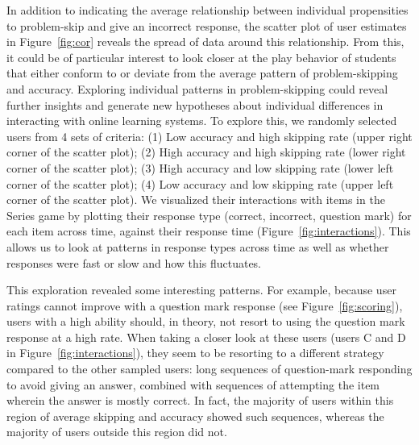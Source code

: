 \documentclass{edm_article}
\begin{document}
In addition to indicating the average relationship between individual propensities to problem-skip and give an incorrect response, the scatter plot of user estimates in Figure~\ref{fig:cor} reveals the spread of data around this relationship. From this, it could be of particular interest to look closer at the play behavior of students that either conform to or deviate from the average pattern of problem-skipping and accuracy. Exploring individual patterns in problem-skipping could reveal further insights and generate new hypotheses about individual differences in interacting with online learning systems. To explore this, we randomly selected users from 4 sets of criteria: (1) Low accuracy and high skipping rate (upper right corner of the scatter plot); (2) High accuracy and high skipping rate (lower right corner of the scatter plot); (3) High accuracy and low skipping rate (lower left corner of the scatter plot); (4) Low accuracy and low skipping rate (upper left corner of the scatter plot). We visualized their interactions with items in the Series game by plotting their response type (correct, incorrect, question mark) for each item across time, against their response time (Figure~\ref{fig:interactions}). This allows us to look at patterns in response types across time as well as whether responses were fast or slow and how this fluctuates. 

This exploration revealed some interesting patterns. For example, because user ratings cannot improve with a question mark response (see Figure~\ref{fig:scoring}), users with a high ability should, in theory, not resort to using the question mark response at a high rate. When taking a closer look at these users (users C and D in Figure~\ref{fig:interactions}), they seem to be resorting to a different strategy compared to the other sampled users: long sequences of question-mark responding to avoid giving an answer, combined with sequences of attempting the item wherein the answer is mostly correct. In fact, the majority of users within this region of average skipping and accuracy showed such sequences, whereas the majority of users outside this region did not. 
 
\end{document}
